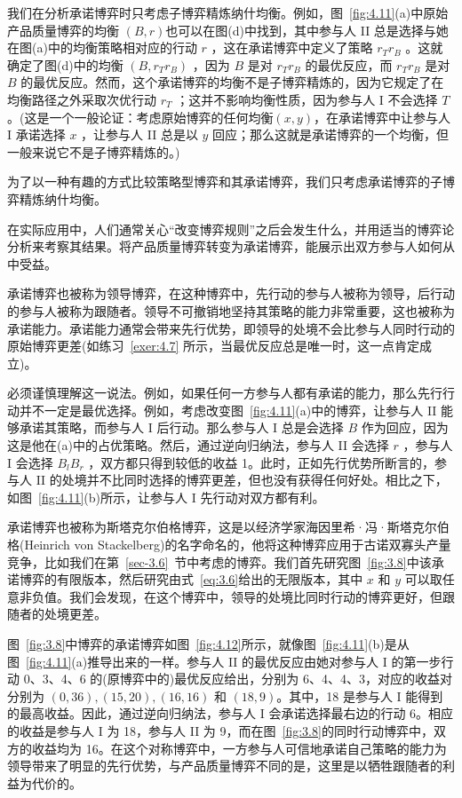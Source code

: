 我们在分析承诺博弈时只考虑子博弈精炼纳什均衡。例如，图~\ref{fig:4.11}(a)中原始产品质量博弈的均衡 $(B,r)$也可以在图(d)中找到，其中参与人 II 总是选择与她在图(a)中的均衡策略相对应的行动 \(r\) ，这在承诺博弈中定义了策略 \({r}_{T}{r}_{B}\) 。这就确定了图(d)中的均衡 \(\left( {B,{r}_{T}{r}_{B}}\right)\) ，因为 \(B\) 是对 \({r}_{T}{r}_{B}\) 的最优反应，而 \({r}_{T}{r}_{B}\) 是对 \(B\) 的最优反应。然而，这个承诺博弈的均衡不是子博弈精炼的，因为它规定了在均衡路径之外采取次优行动 \({r}_{T}\) ；这并不影响均衡性质，因为参与人 I 不会选择 \(T\) 。(这是一个一般论证：考虑原始博弈的任何均衡$(x,y)$，在承诺博弈中让参与人 I 承诺选择 \(x\) ，让参与人 II 总是以 \(y\) 回应；那么这就是承诺博弈的一个均衡，但一般来说它不是子博弈精炼的。)

为了以一种有趣的方式比较策略型博弈和其承诺博弈，我们只考虑承诺博弈的子博弈精炼纳什均衡。

在实际应用中，人们通常关心“改变博弈规则”之后会发生什么，并用适当的博弈论分析来考察其结果。将产品质量博弈转变为承诺博弈，能展示出双方参与人如何从中受益。

承诺博弈也被称为领导博弈，在这种博弈中，先行动的参与人被称为领导，后行动的参与人被称为跟随者。领导不可撤销地坚持其策略的能力非常重要，这也被称为承诺能力。承诺能力通常会带来先行优势，即领导的处境不会比参与人同时行动的原始博弈更差(如练习~\ref{exer:4.7} 所示，当最优反应总是唯一时，这一点肯定成立)。

必须谨慎理解这一说法。例如，如果任何一方参与人都有承诺的能力，那么先行行动并不一定是最优选择。例如，考虑改变图~\ref{fig:4.11}(a)中的博弈，让参与人 II 能够承诺其策略，而参与人 I 后行动。那么参与人 I 总是会选择 \(B\) 作为回应，因为这是他在(a)中的占优策略。然后，通过逆向归纳法，参与人 II 会选择 \(r\) ，参与人 I 会选择 \({B}_{l}{B}_{r}\) ，双方都只得到较低的收益 1。此时，正如先行优势所断言的，参与人 II 的处境并不比同时选择的博弈更差，但也没有获得任何好处。相比之下，如图~\ref{fig:4.11}(b)所示，让参与人 I 先行动对双方都有利。

承诺博弈也被称为斯塔克尔伯格博弈，这是以经济学家海因里希·冯·斯塔克尔伯格(Heinrich von Stackelberg)的名字命名的，他将这种博弈应用于古诺双寡头产量竞争，比如我们在第~\ref{sec-3.6}~节中考虑的博弈。我们首先研究图~\ref{fig:3.8}中该承诺博弈的有限版本，然后研究由式~\eqref{eq:3.6}给出的无限版本，其中 \(x\) 和 \(y\) 可以取任意非负值。我们会发现，在这个博弈中，领导的处境比同时行动的博弈更好，但跟随者的处境更差。

图~\ref{fig:3.8}中博弈的承诺博弈如图~\ref{fig:4.12}所示，就像图~\ref{fig:4.11}(b)是从图~\ref{fig:4.11}(a)推导出来的一样。参与人 II 的最优反应由她对参与人 I 的第一步行动 0、3、4、6 的(原博弈中的)最优反应给出，分别为 6、4、4、3，对应的收益对分别为 \(\left( {0,{36}}\right) ,\left( {{15},{20}}\right) ,\left( {{16},{16}}\right)\) 和 \(\left( {{18},9}\right)\)。其中，18 是参与人 I 能得到的最高收益。因此，通过逆向归纳法，参与人 I 会承诺选择最右边的行动 6。相应的收益是参与人 I 为 18，参与人 II 为 9，而在图~\ref{fig:3.8}的同时行动博弈中，双方的收益均为 16。在这个对称博弈中，一方参与人可信地承诺自己策略的能力为领导带来了明显的先行优势，与产品质量博弈不同的是，这里是以牺牲跟随者的利益为代价的。

